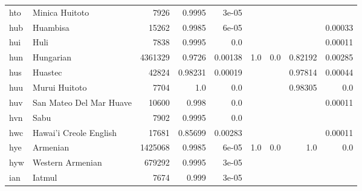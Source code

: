 \documentclass[11pt]{article}
\begin{document}
\begin{table*}[h]
{\begin{tabular}{llrrrrrrr}
hto         & Minica Huitoto         & 7926         & 0.9995         & 3e-05         &          &          &          &          \\

hub         & Huambisa         & 15262         & 0.9985         & 6e-05         &          &          &          & 0.00033         \\

hui         & Huli         & 7838         & 0.9995         & 0.0         &          &          &          & 0.00011         \\

hun         & Hungarian         & 4361329         & 0.9726         & 0.00138         & 1.0         & 0.0         & 0.82192         & 0.00285         \\

hus         & Huastec         & 42824         & 0.98231         & 0.00019         &          &          & 0.97814         & 0.00044         \\

huu         & Murui Huitoto         & 7704         & 1.0         & 0.0         &          &          & 0.98305         & 0.0         \\

huv         & San Mateo Del Mar Huave         & 10600         & 0.998         & 0.0         &          &          &          & 0.00011         \\

hvn         & Sabu         & 7902         & 0.9995         & 0.0         &          &          &          &          \\

hwc         & Hawai'i Creole English         & 17681         & 0.85699         & 0.00283         &          &          &          & 0.00011         \\

hye         & Armenian         & 1425068         & 0.9985         & 6e-05         & 1.0         & 0.0         & 1.0         & 0.0         \\

hyw         & Western Armenian         & 679292         & 0.9995         & 3e-05         &          &          &          &          \\

ian         & Iatmul         & 7674         & 0.999         & 3e-05         &          &          &          &          \\


\end{tabular}}
\end{table*}
\end{document}
